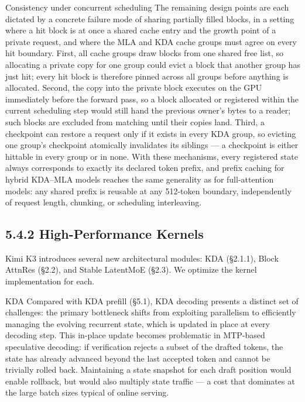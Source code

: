 \documentclass[
  10
]{article}
\newcounter{none} %
\begin{document}
Consistency under concurrent scheduling The remaining design points are
each dictated by a concrete failure mode of sharing partially filled
blocks, in a setting where a hit block is at once a shared cache entry
and the growth point of a private request, and where the MLA and KDA
cache groups must agree on every hit boundary. First, all cache groups
draw blocks from one shared free list, so allocating a private copy for
one group could evict a block that another group has just hit; every hit
block is therefore pinned across all groups before anything is
allocated. Second, the copy into the private block executes on the GPU
immediately before the forward pass, so a block allocated or registered
within the current scheduling step would still hand the previous owner's
bytes to a reader; such blocks are excluded from matching until their
copies land. Third, a checkpoint can restore a request only if it exists
in every KDA group, so evicting one group's checkpoint atomically
invalidates its siblings --- a checkpoint is either hittable in every
group or in none. With these mechanisms, every registered state always
corresponds to exactly its declared token prefix, and prefix caching for
hybrid KDA--MLA models reaches the same generality as for full-attention
models: any shared prefix is reusable at any 512-token boundary,
independently of request length, chunking, or scheduling interleaving.

\subsection{5.4.2 High-Performance
Kernels}\label{high-performance-kernels}

Kimi K3 introduces several new architectural modules: KDA (§2.1.1),
Block AttnRes (§2.2), and Stable LatentMoE (§2.3). We optimize the
kernel implementation for each.

KDA Compared with KDA prefill (§5.1), KDA decoding presents a distinct
set of challenges: the primary bottleneck shifts from exploiting
parallelism to efficiently managing the evolving recurrent state, which
is updated in place at every decoding step. This in-place update becomes
problematic in MTP-based speculative decoding: if verification rejects a
subset of the drafted tokens, the state has already advanced beyond the
last accepted token and cannot be trivially rolled back. Maintaining a
state snapshot for each draft position would enable rollback, but would
also multiply state traffic --- a cost that dominates at the large batch
sizes typical of online serving.
\end{document}
